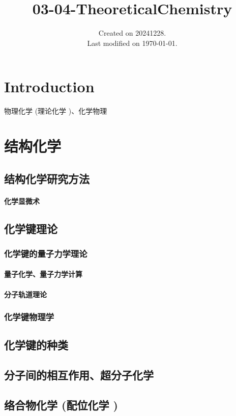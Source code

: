 \documentclass[UTF8]{../03-Chemistry}
\begin{document}
\title{03-04-TheoreticalChemistry}
\date{Created on 20241228.\\   Last modified on \today.}
\maketitle
\tableofcontents


\chapter{Introduction}

物理化学 (理论化学 )、化学物理


\chapter{结构化学}
\section{结构化学研究方法}
    \subsubsection{化学显微术}
\section{化学键理论}
    \subsection{化学键的量子力学理论}
        \subsubsection{量子化学、量子力学计算}
        \subsubsection{分子轨道理论}
    \subsection{化学键物理学}
\section{化学键的种类}
\section{分子间的相互作用、超分子化学}
\section{络合物化学 (配位化学 )}
\end{document}
